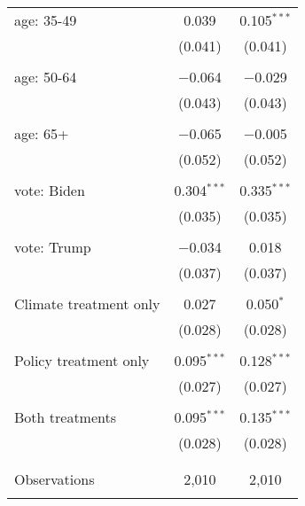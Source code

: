 \begin{tabular}{@{\extracolsep{5pt}}lcc}
 age: 35-49 & 0.039 & 0.105$^{***}$ \\ 
  & (0.041) & (0.041) \\ 
  & & \\ 
 age: 50-64 & $-$0.064 & $-$0.029 \\ 
  & (0.043) & (0.043) \\ 
  & & \\ 
 age: 65+ & $-$0.065 & $-$0.005 \\ 
  & (0.052) & (0.052) \\ 
  & & \\ 
 vote: Biden & 0.304$^{***}$ & 0.335$^{***}$ \\ 
  & (0.035) & (0.035) \\ 
  & & \\ 
 vote: Trump & $-$0.034 & 0.018 \\ 
  & (0.037) & (0.037) \\ 
  & & \\ 
 Climate treatment only & 0.027 & 0.050$^{*}$ \\ 
  & (0.028) & (0.028) \\ 
  & & \\ 
 Policy treatment only & 0.095$^{***}$ & 0.128$^{***}$ \\ 
  & (0.027) & (0.027) \\ 
  & & \\ 
 Both treatments & 0.095$^{***}$ & 0.135$^{***}$ \\ 
  & (0.028) & (0.028) \\ 
  & & \\ 
\hline \\[-1.8ex] 

Observations & 2,010 & 2,010 \\ 
\hline 
\hline \\[-1.8ex] 
\end{tabular} 